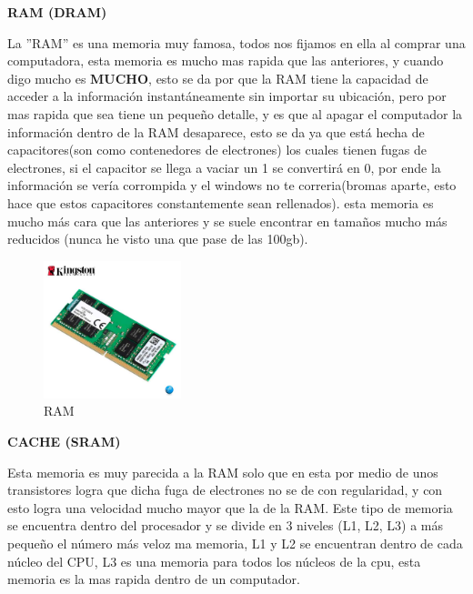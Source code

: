 \documentclass{article}
\begin{document}
\vspace{3cm}
\begin{center}
    \textbf{RAM (DRAM)}
\end{center}
La ''RAM'' es una memoria muy famosa, todos nos fijamos en ella al comprar una computadora, esta memoria es mucho mas rapida que las anteriores, y cuando digo mucho es \textbf{MUCHO}, esto se da por que la RAM tiene la capacidad de acceder a la información instantáneamente sin importar su ubicación, pero por mas rapida que sea tiene un pequeño detalle, y es que al apagar el computador la información dentro de la RAM desaparece, esto se da ya que está hecha de capacitores(son como contenedores de electrones) los cuales tienen fugas de electrones, si el capacitor se llega a vaciar un 1 se convertirá en 0,  por ende la información se vería corrompida y el windows no te correria(bromas aparte, esto hace que estos capacitores constantemente sean rellenados). esta memoria es mucho más cara que las anteriores y se suele encontrar en tamaños mucho más reducidos (nunca he visto una que pase de las 100gb).\cite{pdfu}
\begin{figure}
    \centering
    \includegraphics[width=4cm]{RAM.jpg}
    \caption{RAM}
    \label{fig:my_label}
\end{figure}

\vspace{1cm}

\begin{center}
    \textbf{CACHE (SRAM)}
\end{center}

\vspace{1cm}
Esta memoria es muy parecida a la RAM solo que en esta por medio de unos transistores logra que dicha fuga de electrones no se de con regularidad, y con esto logra una velocidad mucho mayor que la de la RAM. Este tipo de memoria se encuentra dentro del procesador y se divide en 3 niveles (L1, L2, L3) a más pequeño el número más veloz ma memoria, L1 y L2 se encuentran dentro de cada núcleo del CPU, L3 es una memoria para todos los núcleos de la cpu, esta memoria es la mas rapida dentro de un computador. \cite{pdfu} 
\vspace{3cm}
\end{document}
